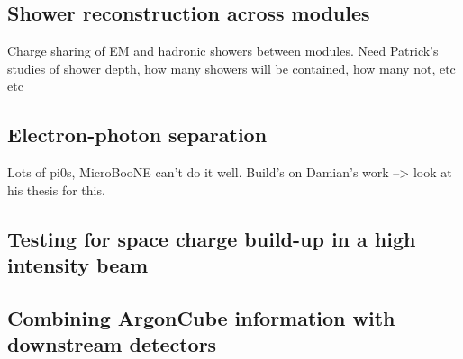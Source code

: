 \subsection{Shower reconstruction across modules}
Charge sharing of EM and hadronic showers between modules. Need Patrick's studies of shower depth, how many showers will be contained, how many not, etc etc

\subsection{Electron-photon separation}
Lots of pi0s, MicroBooNE can't do it well. Build's on Damian's work --> look at his thesis for this.

\subsection{Testing for space charge build-up in a high intensity beam}

\subsection{Combining ArgonCube information with downstream detectors}
